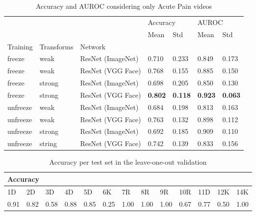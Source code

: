 \begin{table}[h!tp]
\centering
\caption{Accuracy and AUROC considering only Acute Pain videos}
\label{tab:accuracy_auroc_ap}
\begin{tabular}{lllllll}
\toprule
         &        &          & \multicolumn{2}{l}{Accuracy} & \multicolumn{2}{l}{AUROC} \\
         &        &          &      Mean &       Std &      Mean &       Std \\
Training & Transforms & Network &           &           &           &           \\
\midrule
freeze   & weak   & ResNet (ImageNet) &  0.710 &  0.233 &  0.849 &  0.173 \\
freeze   & weak   & ResNet (VGG Face) &  0.768 &  0.155 &  0.885 &  0.150 \\
freeze   & strong & ResNet (ImageNet) &  0.698 &  0.205 &  0.850 &  0.130 \\
freeze   & strong & ResNet (VGG Face) &  \textbf{0.802} & \textbf{ 0.118} &  \textbf{0.923} &  \textbf{0.063} \\
unfreeze & weak   & ResNet (ImageNet) &  0.684 &  0.198 &  0.813 &  0.163 \\
unfreeze & weak   & ResNet (VGG Face) &  0.763 &  0.132 &  0.898 &  0.112 \\
unfreeze & strong & ResNet (ImageNet) &  0.692 &  0.185 &  0.909 &  0.110 \\
unfreeze & string & ResNet (VGG Face) &  0.742 &  0.139 &  0.833 &  0.156 \\
\bottomrule
\end{tabular}
\end{table}

\begin{table}[h!tp]
\centering
\caption{Accuracy per test set in the leave-one-out validation}
\label{tab:accuracy_leave_one_out}
\begin{tabular}{lllllllllllll}
\hline
\multicolumn{13}{l}{Accuracy}                                                                                                                                                                                                                                                                                                                        \\ \hline
\multicolumn{1}{l|}{1D}   & \multicolumn{1}{l|}{2D}   & \multicolumn{1}{l|}{3D}   & \multicolumn{1}{l|}{4D}   & \multicolumn{1}{l|}{5D}   & \multicolumn{1}{l|}{6K}   & \multicolumn{1}{l|}{7R}   & \multicolumn{1}{l|}{8R}   & \multicolumn{1}{l|}{9R}   & \multicolumn{1}{l|}{10R}  & \multicolumn{1}{l|}{11D}  & \multicolumn{1}{l|}{12K}  & 14K  \\ \hline
\multicolumn{1}{l|}{0.91} & \multicolumn{1}{l|}{0.82} & \multicolumn{1}{l|}{0.58} & \multicolumn{1}{l|}{0.88} & \multicolumn{1}{l|}{0.85} & \multicolumn{1}{l|}{0.25} & \multicolumn{1}{l|}{1.00} & \multicolumn{1}{l|}{1.00} & \multicolumn{1}{l|}{1.00} & \multicolumn{1}{l|}{0.67} & \multicolumn{1}{l|}{0.77} & \multicolumn{1}{l|}{0.50} & 1.00 \\ \hline
\end{tabular}
\end{table}


